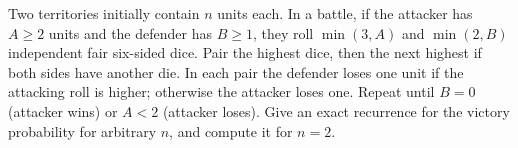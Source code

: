 Two territories initially contain $n$ units each. In a battle, if the attacker has $A\ge2$ units and the defender has $B\ge1$, they roll $\min(3,A)$ and $\min(2,B)$ independent fair six-sided dice. Pair the highest dice, then the next highest if both sides have another die. In each pair the defender loses one unit if the attacking roll is higher; otherwise the attacker loses one. Repeat until $B=0$ (attacker wins) or $A<2$ (attacker loses). Give an exact recurrence for the victory probability for arbitrary $n$, and compute it for $n=2$.

